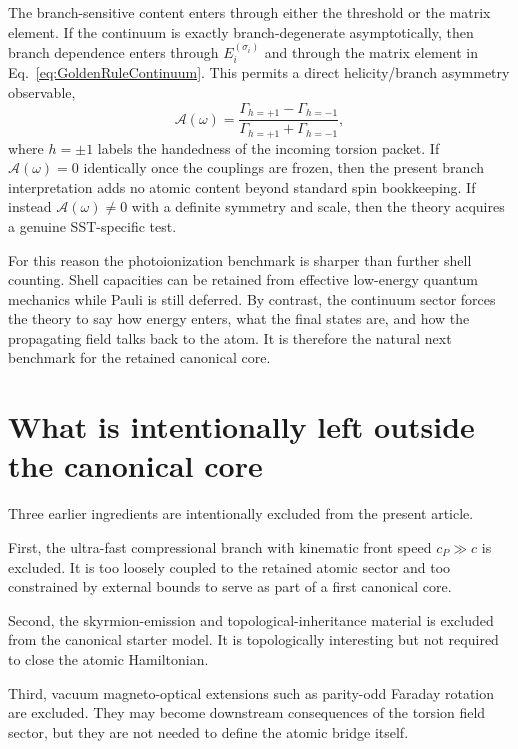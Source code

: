 \documentclass[11pt,a4paper]{article}
\begin{document}
The branch-sensitive content enters through either the threshold or the matrix element. If the continuum is exactly branch-degenerate asymptotically, then branch dependence enters through $E_i^{(\sigma_i)}$ and through the matrix element in Eq.~\eqref{eq:GoldenRuleContinuum}. This permits a direct helicity/branch asymmetry observable,
\begin{equation}
\label{eq:Asymmetry}
\boxed{
\mathcal A(\omega)
=
\frac{\Gamma_{h=+1}-\Gamma_{h=-1}}{\Gamma_{h=+1}+\Gamma_{h=-1}},
}
\end{equation}
where $h=\pm 1$ labels the handedness of the incoming torsion packet. If $\mathcal A(\omega)=0$ identically once the couplings are frozen, then the present branch interpretation adds no atomic content beyond standard spin bookkeeping. If instead $\mathcal A(\omega)\neq 0$ with a definite symmetry and scale, then the theory acquires a genuine SST-specific test.

For this reason the photoionization benchmark is sharper than further shell counting. Shell capacities can be retained from effective low-energy quantum mechanics while Pauli is still deferred. By contrast, the continuum sector forces the theory to say how energy enters, what the final states are, and how the propagating field talks back to the atom. It is therefore the natural next benchmark for the retained canonical core.

\section{What is intentionally left outside the canonical core}
Three earlier ingredients are intentionally excluded from the present article.

First, the ultra-fast compressional branch with kinematic front speed $c_P\gg c$ is excluded. It is too loosely coupled to the retained atomic sector and too constrained by external bounds to serve as part of a first canonical core.

Second, the skyrmion-emission and topological-inheritance material is excluded from the canonical starter model. It is topologically interesting but not required to close the atomic Hamiltonian.

Third, vacuum magneto-optical extensions such as parity-odd Faraday rotation are excluded. They may become downstream consequences of the torsion field sector, but they are not needed to define the atomic bridge itself.
\end{document}
